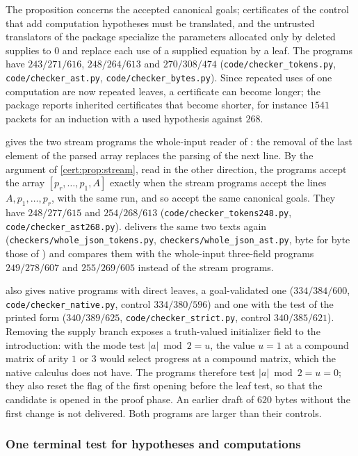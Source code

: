 The proposition concerns the accepted canonical goals; certificates of the
control that add computation hypotheses must be translated, and the untrusted
translators of the package specialize the parameters allocated only by deleted
supplies to $0$ and replace each use of a supplied equation by a leaf. The
programs have $243/271/616$, $248/264/613$ and $270/308/474$
(\texttt{code/checker\_tokens.py}, \texttt{code/checker\_ast.py},
\texttt{code/checker\_bytes.py}). Since repeated uses of one computation are
now repeated leaves, a certificate can become longer; the package reports
inherited certificates that become shorter, for instance $1541$ packets for
an induction with a used hypothesis against $268$.

 gives the two stream programs the whole-input
reader of : the removal of the last element of the parsed
array replaces the parsing of the next line. By the argument of
\cref{cert:prop:stream}, read in the other direction, the programs accept the
array $[p_r,\dots,p_1,A]$ exactly when the stream programs accept the lines
$A,p_1,\dots,p_r$, with the same run, and so accept the same canonical goals.
They have $248/277/615$ and $254/268/613$
(\texttt{code/checker\_tokens248.py}, \texttt{code/checker\_ast268.py}).
 delivers the same two texts again
(\texttt{checkers/whole\_json\_tokens.py}, \texttt{checkers/whole\_json\_ast.py},
byte for byte those of ) and compares them with
the whole-input three-field programs $249/278/607$ and $255/269/605$ instead
of the stream programs.

 also gives native programs with direct leaves, a
goal-validated one ($334/384/600$, \texttt{code/checker\_native.py}, control
$334/380/596$) and one with the test of the printed form ($340/389/625$,
\texttt{code/checker\_strict.py}, control $340/385/621$). Removing the
supply branch exposes a truth-valued initializer field to the introduction:
with the mode test $\lvert a\rvert\bmod 2=u$, the value $u=1$ at a compound
matrix of arity $1$ or $3$ would select progress at a compound matrix, which
the native calculus does not have. The programs therefore test
$\lvert a\rvert\bmod 2=u=0$; they also reset the flag of the first opening
before the leaf test, so that the candidate is opened in the proof phase. An
earlier draft of $620$ bytes without the first change is not delivered. Both
programs are larger than their controls.

\subsubsection*{One terminal test for hypotheses and computations}

